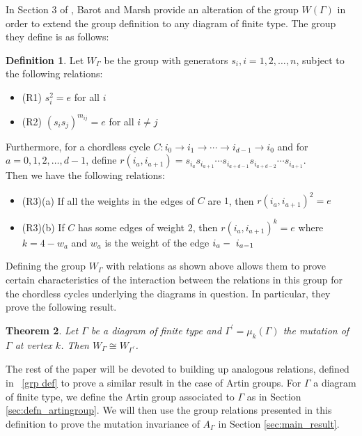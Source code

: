 \documentclass[11pt]{amsart}
\newtheorem{thm}{Theorem}[section]
\theoremstyle{definition}
\newtheorem{defn}[thm]{Definition}
\begin{document}
In Section 3 of \cite{BM13}, Barot and Marsh provide an alteration of the group $W(\Gamma)$ in order to extend the group definition to any diagram of finite type. The group they define is as follows:

\begin{defn}
Let $W_{\Gamma}$ be the group with generators $s_i, i = 1,2,\ldots, n$, subject to the following relations:
\begin{itemize}
\item{(R1)} $s_i^2 = e$ for all $i$
\item{(R2)} $\left(s_is_j\right)^{m_{ij}} = e$ for all $i \neq j$
\end{itemize}
Furthermore, for a chordless cycle $C : i_0 \rightarrow i_1 \rightarrow \cdots \rightarrow i_{d-1} \rightarrow i_0$ and for $a = 0,1,2,\ldots, d-1$, define \textbf{$r\left(i_a, i_{a+1}\right) = s_{i_a}s_{i_{a+1}} \cdots s_{i_{a+d-1}}s_{i_{a+d-2}} \cdots s_{i_{a+1}}$}.\\

\vspace{0.1cm}
Then we have the following relations:
\begin{itemize}
\item{(R3)(a)} If all the weights in the edges of $C$ are $1$, then $r(i_a, i_{a+1})^2 = e$
\item{(R3)(b)} If $C$ has some edges of weight $2$, then $r(i_a, i_{a+1})^k = e$ where $k = 4-w_a$ and $w_a$ is the weight of the edge $i_a\--\ i_{a-1}$
\end{itemize}
\end{defn}

Defining the group $W_{\Gamma}$ with relations as shown above allows them to prove certain characteristics of the interaction between the relations in this group for the chordless cycles underlying the diagrams in question. In particular, they prove the following result.
\begin{thm}\cite[Theorem 5.4a]{BM13}
Let $\Gamma$ be a diagram of finite type and $\Gamma^{\prime} = \mu_k(\Gamma)$ the mutation of $\Gamma$ at vertex $k$. Then $W_{\Gamma} \cong W_{\Gamma^{\prime}}$.
\end{thm}

The rest of the paper will be devoted to building up analogous relations, defined in ~\ref{grp def} to prove a similar result in the case of Artin groups. For $\Gamma$ a diagram of finite type, we define the Artin group associated to $\Gamma$ as in Section \ref{sec:defn_artingroup}. We will then use the group relations presented in this definition to prove the mutation invariance of $A_{\Gamma}$ in Section \ref{sec:main_result}.
\end{document}
